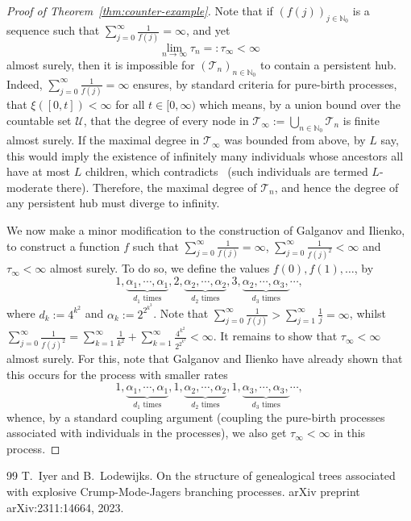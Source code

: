 \documentclass[10pt,a4paper]{amsart}
\begin{document}
\begin{proof}[Proof of Theorem~\ref{thm:counter-example}]
    Note that if $(f(j))_{j \in \mathbb{N}_0}$ is a sequence such that $\sum_{j=0}^{\infty} \frac{1}{f(j)} = \infty$, and yet \[\lim_{n \to \infty} \tau_{n} =: \tau_{\infty} < \infty\] almost surely, then it is impossible for $(\mathcal{T}_{n})_{n \in \mathbb{N}_0}$ to contain a persistent hub. Indeed, $\sum_{j=0}^{\infty} \frac{1}{f(j)} = \infty$ ensures, by standard criteria for pure-birth processes, that $\xi([0,t]) < \infty$ for all $t \in [0, \infty)$ which means, by a union bound over the countable set $\mathcal{U}$, that the degree of every node in $\mathcal{T}_{\infty}:= \bigcup_{n \in \mathbb{N}_0} \mathcal{T}_n$ is finite almost surely. If the maximal degree in $\mathcal{T}_{\infty}$ was bounded from above, by $L$ say, this would imply the existence of infinitely many individuals whose ancestors all have at most $L$ children, which contradicts~\cite[Proposition~4.4]{inhom-sup-pref-attach} (such individuals are termed $L$-moderate there). Therefore, the maximal degree of $\mathcal{T}_{n}$, and hence the degree of any persistent hub must diverge to infinity.  
    
    We now make a minor modification to the construction of Galganov and Ilienko, to construct a function $f$ such that
    $\sum_{j=0}^{\infty} \frac{1}{f(j)} = \infty$, $\sum_{j=0}^{\infty} \frac{1}{f(j)^2} < \infty$ and $\tau_{\infty} < \infty$ almost surely. To do so, we define the values $f(0), f(1), \ldots$, by 
    \[
    1, \underbrace{\alpha_{1}, \cdots, \alpha_1}_{d_1 \text{ times}}, 2, \underbrace{\alpha_{2}, \cdots, \alpha_2}_{d_2 \text{ times}}, 3, \underbrace{\alpha_{2}, \cdots, \alpha_3, }_{d_3 \text{ times}} \cdots, 
    \]
    where $d_{k} := 4^{k^2}$ and $\alpha_{k} := 2^{2^{k^3}}$. Note that $\sum_{j=0}^{\infty} \frac{1}{f(j)} > \sum_{j=1}^{\infty} \frac{1}{j} = \infty$, whilst $\sum_{j=0}^{\infty} \frac{1}{f(j)^{2}} = \sum_{k=1}^{\infty} \frac{1}{k^2} + \sum_{k=1}^{\infty} \frac{4^{k^2}}{2^{2^{k^3}}} < \infty$. 
    It remains to show that $\tau_{\infty} < \infty$ almost surely. For this, note that Galganov and Ilienko have already shown that this occurs for the process with smaller rates 
    \[
    1, \underbrace{\alpha_{1}, \cdots, \alpha_1}_{d_1 \text{ times}}, 1, \underbrace{\alpha_{2}, \cdots, \alpha_2}_{d_2 \text{ times}}, 1, \underbrace{\alpha_{3}, \cdots, \alpha_3, }_{d_3 \text{ times}} \cdots, 
    \]
    whence, by a standard coupling argument (coupling the pure-birth processes associated with individuals in the processes), we also get $\tau_{\infty} < \infty$ in this process. 
\end{proof}

\begin{thebibliography}{99}
 T.~Iyer and B.~Lodewijks. \newblock On the structure of genealogical trees associated with explosive {Crump-Mode-Jagers} branching processes. \newblock arXiv preprint arXiv:2311:14664, 2023.
\end{thebibliography}
\end{document}
